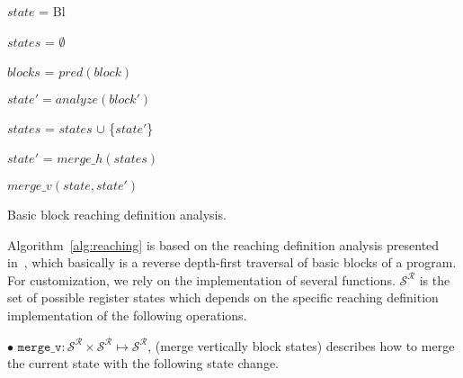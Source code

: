 \begin{algorithm}[!ht]
        \footnotesize
	\SetAlgoLined
        \BlankLine
	{
 	$state$ = Bl                                   
 	

	$states$ = $\emptyset$                         
	
	$blocks$ = $pred(block)$                         
	
	 {
	
 		$state' = analyze(block')$             
 		
		$states$ = $states$ $\cup$ \{$state'$\}  
	}

	$state'$ = $merge\_h (states)$                   

	\Return $merge\_v(state, state')$              

	}
\caption{Basic block reaching definition analysis.}
\label{alg:reaching}
\end{algorithm}

Algorithm~\ref{alg:reaching} is based on the reaching definition analysis presented in~\cite{khedker2009data}, 
which basically is a reverse depth-first traversal of basic blocks of a program. For customization, we rely on 
the implementation of several functions. $\mathcal{S}^\mathcal{R}$ is the set of possible register states 
which depends on the specific reaching definition implementation of the following operations.

$\bullet$ $\texttt{merge\_v} : \mathcal{S}^\mathcal{R} \times \mathcal{S}^\mathcal{R} \mapsto \mathcal{S}^\mathcal{R}$, (merge vertically block states) describes how to merge the current state with the following state change.

